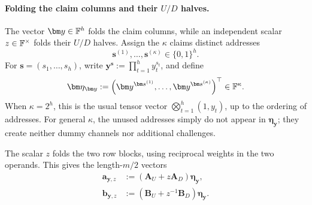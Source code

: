 \documentclass[runningheads]{llncs}
\begin{document}
\paragraph{Folding the claim columns and their \(U/D\) halves.}
The vector \(\bm y\in\Field^h\) folds the claim columns,
while an independent scalar \(z\in{\mathbb{F}}^\times\) folds their \(U/D\)
halves.  Assign the \(\kappa\) claims distinct addresses
\[
    \bm s^{(1)},\ldots,\bm s^{(\kappa)}
      \in\{0,1\}^{h}.
\]
For \(\bm s=(s_1,\ldots,s_h)\), write
\(\bm y^{\bm s}:=\prod_{t=1}^{h}y_t^{s_t}\), and define
\begin{equation}
    \bm\eta_{\bm y}
      :=
      \left(
        \bm y^{\bm s^{(1)}},\ldots,
        \bm y^{\bm s^{(\kappa)}}
      \right)^\top
      \in\Field^\kappa.
\label{eq:wht-fold-definition}
\end{equation}
When \(\kappa=2^h\), this is the usual tensor vector
\(\bigotimes_{t=1}^{h}(1,y_t)\), up to the ordering of addresses.
For general \(\kappa\), the unused addresses simply do not appear in
\(\bm\eta_{\bm y}\); they create neither dummy channels nor additional
challenges.

The scalar \(z\) folds the two row blocks, using reciprocal weights
in the two operands.  This gives the length-\(m/2\) vectors
\begin{equation}
\begin{aligned}
    \bm a_{\bm y,z}
      &:=
      \left(
        \bm A_U+
        z\bm A_D
      \right) \bm{\eta}_{\bm y},\\
    \bm b_{\bm y,z}
      &:=
      \left(
        \bm B_U+
        z^{-1} \bm B_D
      \right) \bm{\eta}_{\bm y}.
\end{aligned}
\label{eq:wht-vector-fold}
\end{equation}
\end{document}

